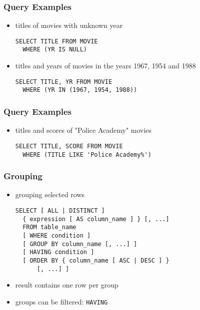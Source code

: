 \documentclass[dvipsnames]{beamer}
\theoremstyle{plain}
\begin{document}
\begin{frame}[fragile]
  \frametitle{Query Examples}

  \begin{itemize}
    \item titles of movies with unknown year
    \begin{lstlisting}
SELECT TITLE FROM MOVIE
  WHERE (YR IS NULL)
    \end{lstlisting}

    \pause
    \item titles and years of movies in the years 1967, 1954 and 1988
    \begin{lstlisting}
SELECT TITLE, YR FROM MOVIE
  WHERE (YR IN (1967, 1954, 1988))
    \end{lstlisting}
  \end{itemize}
\end{frame}

\begin{frame}[fragile]
  \frametitle{Query Examples}

  \begin{itemize}
    \item titles and scores of "Police Academy" movies
    \begin{lstlisting}
SELECT TITLE, SCORE FROM MOVIE
  WHERE (TITLE LIKE 'Police Academy%')
    \end{lstlisting}
  \end{itemize}
\end{frame}

\begin{frame}[fragile]
  \frametitle{Grouping}

  \begin{itemize}
    \item grouping selected rows
    \begin{lstlisting}
SELECT [ ALL | DISTINCT ]
  { expression [ AS column_name ] } [, ...]
  FROM table_name
  [ WHERE condition ]
  [ GROUP BY column_name [, ...] ]
  [ HAVING condition ]
  [ ORDER BY { column_name [ ASC | DESC ] }
      [, ...] ]
    \end{lstlisting}

    \medskip
    \item result contains one row per group
    \item groups can be filtered: \lstinline!HAVING!
  \end{itemize}
\end{frame}
\end{document}
